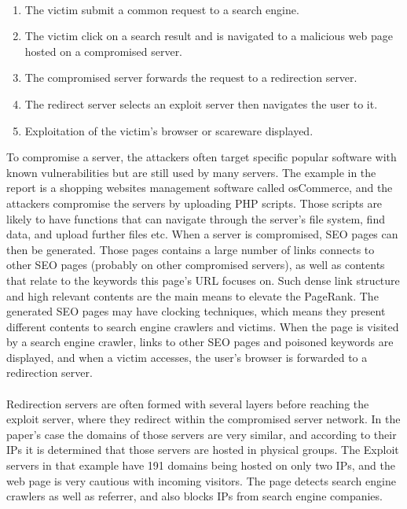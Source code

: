 \paragraph{}
\begin{enumerate} 
\item The victim submit a common request to a search engine.
\item The victim click on a search result and is navigated to a malicious web
page hosted on a compromised server.
\item The compromised server forwards the request to a redirection server.
\item The redirect server selects an exploit server then navigates the user
to it. 
\item Exploitation of the victim's browser or scareware displayed. 
\end{enumerate}
To compromise a server, the attackers often target specific popular software
with known vulnerabilities but are still used by many servers. The example in
the report is a shopping websites management software called osCommerce, and
the attackers compromise the servers by uploading PHP scripts. Those scripts
are likely to have functions that can navigate through the server's file system,
find data, and upload further files etc. When a server is compromised, SEO
pages can then be generated. Those pages contains a large number of links
connects to other SEO pages (probably on other compromised servers), as well as
contents that relate to the keywords this page's URL focuses on. Such dense
link structure and high relevant contents are the main means to elevate the
PageRank. The generated SEO pages may have clocking techniques, which means
they present different contents to search engine crawlers and victims. When the
page is visited by a search engine crawler, links to other SEO pages and
poisoned keywords are displayed, and when a victim accesses, the user's browser
is forwarded to a redirection server. 
\paragraph{}
Redirection servers are often formed
with several layers before reaching the exploit server, where they redirect
within the compromised server network. In the paper's case the domains of those
servers are very similar, and according to their IPs it is determined that those
servers are hosted in physical groups. The Exploit servers in that example have
191 domains being hosted on only two IPs, and the web page is very cautious with
incoming visitors. The page detects search engine crawlers as well as referrer,
and also blocks IPs from search engine companies. 

